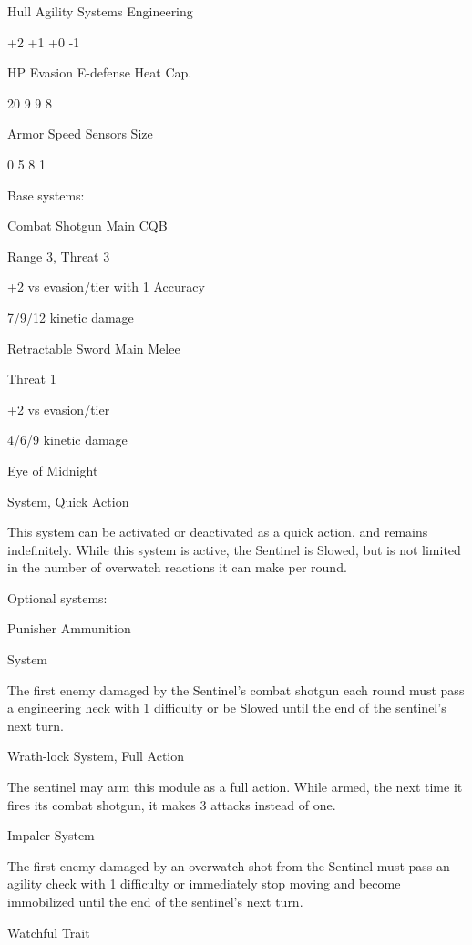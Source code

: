  Hull       Agility     Systems       Engineering 

 +2         +1           +0           -1 

 HP         Evasion      E-defense    Heat Cap. 

 20         9            9            8 

 Armor      Speed       Sensors       Size 

 0          5            8            1
 

Base systems:  

Combat Shotgun  
Main CQB
 
Range 3, Threat 3
 
+2 vs evasion/tier with 1 Accuracy
 
7/9/12 kinetic damage
 

Retractable Sword  
Main Melee
 
Threat 1
 
+2 vs evasion/tier
 
4/6/9 kinetic damage
 

Eye of Midnight
 
System, Quick Action
 
This system can be activated or deactivated as a quick action, and remains indefinitely. While  
this system is active, the Sentinel is Slowed, but is not limited in the number of overwatch  
reactions it can make per round.
 

Optional systems:  

Punisher Ammunition  

                                                                                                         


System
 
The first enemy damaged by the Sentinel’s combat shotgun each round must pass a engineering  
heck with 1 difficulty or be Slowed until the end of the sentinel’s next turn.
 

Wrath-lock  
System, Full Action
 
The sentinel may arm this module as a full action. While armed, the next time it fires its combat  
shotgun, it makes 3 attacks instead of one.
 

Impaler  
System
 
The first enemy damaged by an overwatch shot from the Sentinel must pass an agility check  
with 1 difficulty or immediately stop moving and become immobilized until the end of the  
sentinel’s next turn.
 

Watchful  
Trait
 
